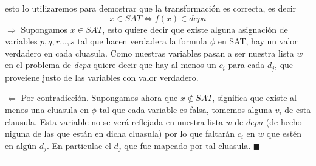 \documentclass[12pt,letterpaper]{article}
\newcommand{\lineaxd}{{\color{brown}\rule{\linewidth}{0.5mm}}}
\begin{document}
\begin{itemize}
    esto lo utilizaremos para demostrar que la transformación es correcta, es decir 
    $$x \in SAT \Leftrightarrow f(x) \in depa $$
    \newpage
    $\Rightarrow$ Supongamos $x \in SAT$, esto quiere decir que existe alguna asignación de variables $p,q,r..., s$ tal que hacen verdadera la formula $\phi$ en SAT, hay un valor verdadero en cada cluasula. Como nuestras variables pasan a ser nuestra lista $w$ en el problema de \textit{depa} quiere decir que hay al menos un $c_i$ para cada $d_j$, que proveiene justo de las variables con valor verdadero.
    
    $\Leftarrow$ Por contradicción. Supongamos ahora que $x \notin SAT$, significa que existe al menos una cluasula en $\phi$ tal que cada variable es falsa, tomemos alguna $v_i$ de esta clausula. Esta variable no se verá reflejada en nuestra lista $w$ de $depa$ (de hecho niguna de las que están en dicha cluasula) por lo que faltarán $c_i$ en $w$ que estén en algún $d_j$. En particulae el $d_j$ que fue mapeado por tal cluasula. $\blacksquare$
\end{itemize}



\lineaxd
\end{document}
